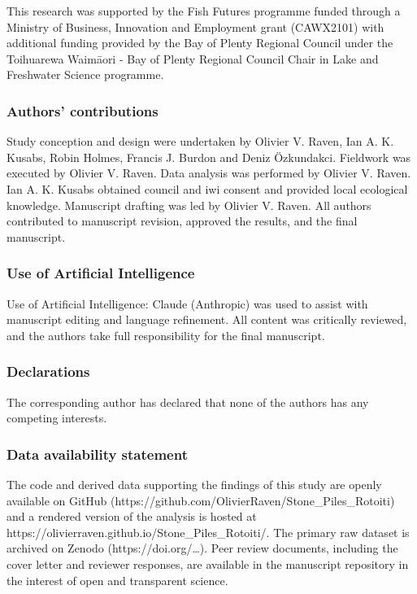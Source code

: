 \documentclass[
  letterpaper,
  DIV=11,
  numbers=noendperiod]{scrartcl}
\newcounter{none} %
\begin{document}
This research was supported by the Fish Futures programme funded through
a Ministry of Business, Innovation and Employment grant (CAWX2101) with
additional funding provided by the Bay of Plenty Regional Council under
the Toihuarewa Waimāori - Bay of Plenty Regional Council Chair in Lake
and Freshwater Science programme.

\subsubsection{Authors' contributions}\label{authors-contributions}

Study conception and design were undertaken by Olivier V. Raven, Ian A.
K. Kusabs, Robin Holmes, Francis J. Burdon and Deniz Özkundakci.
Fieldwork was executed by Olivier V. Raven. Data analysis was performed
by Olivier V. Raven. Ian A. K. Kusabs obtained council and iwi consent
and provided local ecological knowledge. Manuscript drafting was led by
Olivier V. Raven. All authors contributed to manuscript revision,
approved the results, and the final manuscript.

\subsubsection{Use of Artificial
Intelligence}\label{use-of-artificial-intelligence}

Use of Artificial Intelligence: Claude (Anthropic) was used to assist
with manuscript editing and language refinement. All content was
critically reviewed, and the authors take full responsibility for the
final manuscript.

\subsubsection{Declarations}\label{declarations}

The corresponding author has declared that none of the authors has any
competing interests.

\subsubsection{Data availability
statement}\label{data-availability-statement}

The code and derived data supporting the findings of this study are
openly available on GitHub
(https://github.com/OlivierRaven/Stone\_Piles\_Rotoiti) and a rendered
version of the analysis is hosted at
https://olivierraven.github.io/Stone\_Piles\_Rotoiti/. The primary raw
dataset is archived on Zenodo (https://doi.org/\ldots). Peer review
documents, including the cover letter and reviewer responses, are
available in the manuscript repository in the interest of open and
transparent science.
\end{document}
